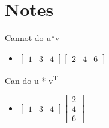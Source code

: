 \documentclass[11pt]{article}
\begin{document}
\section{Notes}
\label{sec:orgd7be7ef}
Cannot do u*v
\begin{itemize}
\item \(\begin{bmatrix}1&3&4\end{bmatrix} \begin{bmatrix}2&4&6\end{bmatrix}\)
\end{itemize}
Can do u * v\textsuperscript{T}
\begin{itemize}
\item \(\begin{bmatrix}1&3&4\end{bmatrix} \begin{bmatrix}2\\4\\6\end{bmatrix}\)
\end{itemize}
\end{document}
